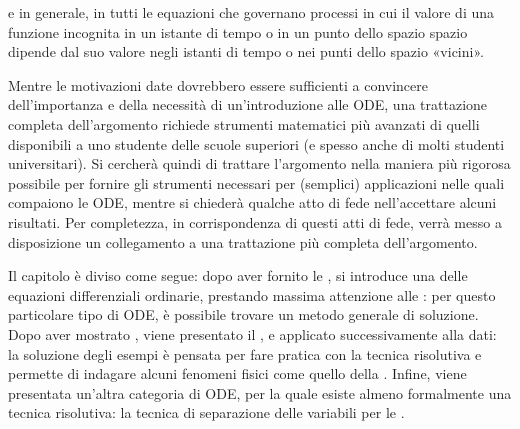 \documentclass[letterpaper,10pt,italian]{jupyterBook}
\begin{document}
\sphinxAtStartPar
e in generale, in tutti le equazioni che governano processi in cui il valore di una funzione incognita in un istante di tempo o in un punto dello spazio spazio dipende dal suo valore negli istanti di tempo o nei punti dello spazio «vicini».

\sphinxAtStartPar
{}
Mentre le motivazioni date dovrebbero essere sufficienti a convincere dell’importanza e della necessità di un’introduzione alle ODE, una trattazione completa dell’argomento richiede strumenti matematici più avanzati di quelli disponibili a uno studente delle scuole superiori (e spesso anche di molti studenti universitari).
Si cercherà quindi di trattare l’argomento nella maniera più rigorosa possibile per fornire gli strumenti necessari per (semplici) applicazioni nelle quali compaiono le ODE, mentre si chiederà qualche atto di fede nell’accettare alcuni risultati. Per completezza, in corrispondenza di questi atti di fede, verrà messo a disposizione un collegamento a una trattazione più completa dell’argomento.

\sphinxAtStartPar
{}
Il capitolo è diviso come segue: dopo aver fornito le {\hyperref[\detokenize{ch/ode:ode-hs-def}]{}}, si introduce una {\hyperref[\detokenize{ch/ode:ode-hs-types}]{}} delle equazioni differenziali ordinarie, prestando massima attenzione alle {\hyperref[\detokenize{ch/ode:ode-hs-types-linear-const}]{}}: per questo particolare tipo di ODE, è possibile trovare un metodo generale di soluzione. Dopo aver mostrato {\hyperref[\detokenize{ch/ode:ode-hs-types-linear-const-ex}]{}}, viene presentato il {\hyperref[\detokenize{ch/ode:ode-hs-types-linear-const-sol}]{}}, e applicato successivamente alla {\hyperref[\detokenize{ch/ode:ode-hs-types-linear-const-ex-sol}]{}} dati: la soluzione degli esempi è pensata per fare pratica con la tecnica risolutiva e permette di indagare alcuni fenomeni fisici come quello della   . Infine, viene presentata un’altra categoria di ODE, per la quale esiste \sphinxhyphen{} almeno formalmente \sphinxhyphen{} una tecnica risolutiva: la tecnica di separazione delle variabili per le {\hyperref[\detokenize{ch/ode:ode-hs-types-separable}]{}}.
\end{document}

